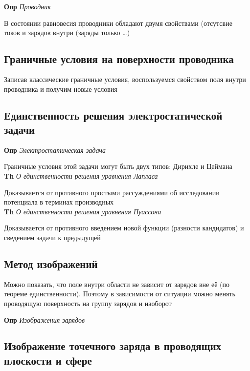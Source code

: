 \documentclass[a4paper, 14pt]{article}
\begin{document}
    \textbf{Опр} \textit{Проводник}
    
    В состоянии равновесия проводники обладают двумя свойствами (отсутсвие токов и зарядов внутри (заряды только \ldots)
    
    \subsection{Граничные условия на поверхности проводника}
    
    Записав классические граничные условия, воспользуемся свойством поля внутри проводника и получим новые условия
    
    \subsection{Единственность решения электростатической задачи}
    
    \textbf{Опр} \textit{Электростатическая задача}
    
    Граничные условия этой задачи могут быть двух типов: Дирихле и Цеймана \\
    
    \textbf{Th} \textit{О единственности решения уравнения Лапласа}
    
    Доказывается от противного простыми рассуждениями об исследовании потенциала в терминах производных \\
    
    \textbf{Th} \textit{О единственности решения уравнения Пуассона}
    
    Доказывается от противного введением новой функции (разности кандидатов) и сведением задачи к предыдущей
    
    \subsection{Метод изображений}
    
    Можно показать, что поле внутри области не зависит от зарядов вне её (по теореме единственности).
    Поэтому в зависимости от ситуации можно менять проводящую поверхность на группу зарядов и наоборот
    
    \textbf{Опр} \textit{Изображения зарядов}
    
    \subsection{Изображение точечного заряда в проводящих плоскости и сфере}
    
\end{document}
